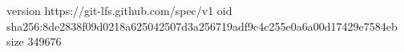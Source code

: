 version https://git-lfs.github.com/spec/v1
oid sha256:8de2838f09d0218a625042507d3a256719adf9c4c255e0a6a00d17429e7584eb
size 349676

